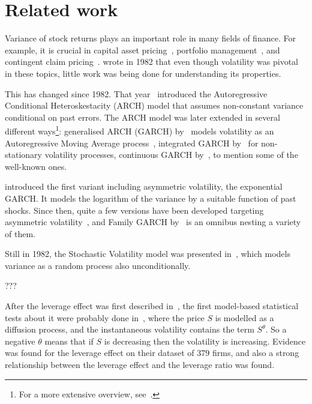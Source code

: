 \section{Related work}

Variance of stock returns plays an important role in many fields of finance.
For example, it is crucial in capital asset pricing~\citep{skiadas2009asset}, portfolio management~\citep{chow2014study}, and contingent claim pricing~\citep{hull1987pricing}.
\citeauthor{Christie1982} wrote in 1982 that even though volatility was pivotal in these topics, little work was being done for understanding its properties.

This has changed since 1982.
That year~\citet{Engle1982} introduced the Autoregressive Conditional Heteroskestacity (ARCH) model that assumes non-constant variance conditional on past errors.
The ARCH model was later extended in several different ways\footnote{For a more extensive overview, see~\citet{bollerslev1994arch}.}: generalised ARCH (GARCH) by~\citet{Bollerslev1986} models volatility as an Autoregressive Moving Average process~\citep{box1994time}, integrated GARCH by~\citet{engle1986modelling} for non-stationary volatility processes, continuous GARCH by~\citet{kluppelberg2004continuous}, to mention some of the well-known ones.

\citet{Nelson1991} introduced the first variant including asymmetric volatility, the exponential GARCH.
It models the logarithm of the variance by a suitable function of past shocks.
Since then, quite a few versions have been developed targeting asymmetric volatility~\citep{engle1993measuring,glosten1993relation,zakoian1994threshold,sentana1995quadratic}, and Family GARCH by~\citet{hentschel1995all} is an omnibus nesting a variety of them.


Still in 1982, the Stochastic Volatility model was presented in~\citet{Taylor1982}, which models variance as a random process also unconditionally.

???

After the leverage effect was first described in~\citet{black1976studies}, the first model-based statistical tests about it were probably done in~\citet{Christie1982}, where the price $S$ is modelled as a diffusion process, and the instantaneous volatility contains the term $S^\theta$.
So a negative $\theta$ means that if $S$ is decreasing then the volatility is increasing.
Evidence was found for the leverage effect on their dataset of 379 firms, and also a strong relationship between the leverage effect and the leverage ratio was found.

